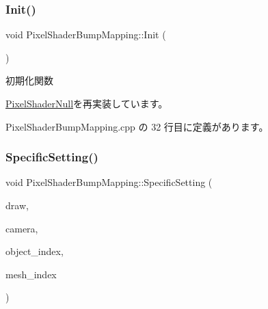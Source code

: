 \mbox{\label{class_pixel_shader_bump_mapping_ab7807b7c56242e965ddb23e66e1a5d9e}} 
\subsubsection{\texorpdfstring{Init()}{Init()}}
{\footnotesize\ttfamily void Pixel\+Shader\+Bump\+Mapping\+::\+Init (\begin{DoxyParamCaption}{ }\end{DoxyParamCaption})\hspace{0.3cm}{\ttfamily [virtual]}}



初期化関数 



\mbox{\hyperlink{class_pixel_shader_null_abfd7a6a986da09061a55d31024219eba}{Pixel\+Shader\+Null}}を再実装しています。



 Pixel\+Shader\+Bump\+Mapping.\+cpp の 32 行目に定義があります。

\mbox{\label{class_pixel_shader_bump_mapping_afa80c2404b490a444d54cc47c681ca8f}} 
\subsubsection{\texorpdfstring{Specific\+Setting()}{SpecificSetting()}}
{\footnotesize\ttfamily void Pixel\+Shader\+Bump\+Mapping\+::\+Specific\+Setting (\begin{DoxyParamCaption}\item[{\mbox{\hyperlink{class_draw_base}{Draw\+Base}} $\ast$}]{draw,  }\item[{\mbox{\hyperlink{class_camera}{Camera}} $\ast$}]{camera,  }\item[{unsigned}]{object\+\_\+index,  }\item[{unsigned}]{mesh\+\_\+index }\end{DoxyParamCaption})\hspace{0.3cm}{\ttfamily [virtual]}}




